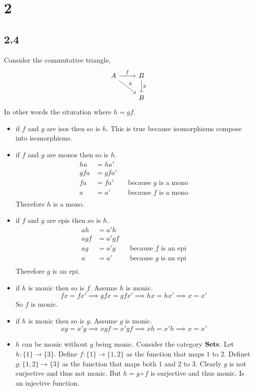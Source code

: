 \documentclass{book}
\theoremstyle{definition}
\newcommand{\arr}[3]{#1 : #2 \rightarrow #3}
\begin{document}
\section{2}

\subsection{2.4}

Consider the commutative triangle,
\[
  \begin{tikzcd}
    A \arrow[r, "f"] \arrow[dr, "h"] & B \arrow[d, "g"] \\
                                     & B
  \end{tikzcd}
\]
In other words the situration where $h = gf$.
\begin{itemize}
  \item if $f$ and $g$ are isos then so is $h$. This is true because
    isomorphisms compose into isomorphisms.
  \item if $f$ and $g$ are monos then so is $h$.
    \begin{align*}
      h a &= h a' \\
      g f a &= g f a' \\
      f a &= f a' && \text{because $g$ is a mono} \\
      a &= a' && \text{because $f$ is a mono} \\
    \end{align*}
    Therefore $h$ is a mono.
  \item if $f$ and $g$ are epis then so is $h$.
    \begin{align*}
      a h &= a' h \\
      a g f &= a' g f \\
      a g &= a' g && \text{because $f$ is an epi} \\
      a &= a' && \text{because $g$ is an epi} \\
    \end{align*}
    Therefore $g$ is an epi.
  \item if $h$ is monic then so is $f$. Assume $h$ is monic.
    \[
      f x = f x' \implies g f x = g f x' \implies h x = h x' \implies x = x'
    \]
    So $f$ is monic.
  \item if $h$ is monic then so is $g$. Assume $g$ is monic. \[ x g = x' g
    \implies x g f = x' g f \implies x h = x' h \implies x = x' \]
  \item $h$ can be monic without $g$ being monic. Consider the category
    $\bf{Sets}$. Let $\arr{h}{\{1\}}{\{3\}}$. Define $\arr{f}{\{1\}}{\{1,2\}}$
    as the function that maps $1$ to $2$. Definet $\arr{g}{\{1,2\}}{\{3\}}$ as
    the function that maps both $1$ and $2$ to $3$. Clearly $g$ is not
    surjective and thus not monic. But $h = g \circ f$ is surjective and thus
    monic. Is an injective function.
\end{itemize}
\end{document}

